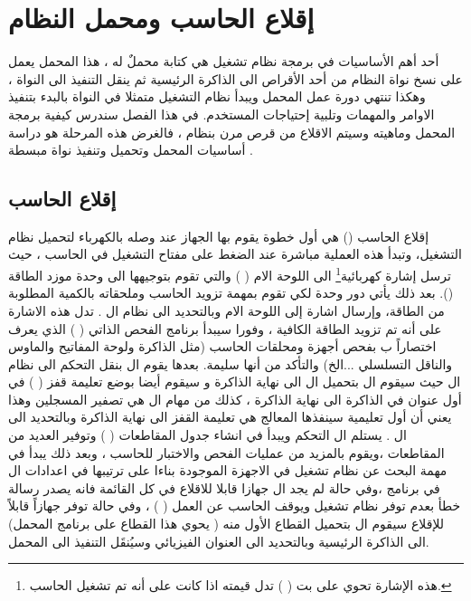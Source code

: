 \documentclass[document.tex]{subfiles}
\begin{document}
\chapter{إقلاع الحاسب ومحمل النظام }
أحد أهم الأساسيات في برمجة نظام تشغيل هي كتابة محملٌ له ، هذا المحمل يعمل على نسخ نواة النظام من أحد الأقراص الى الذاكرة الرئيسية ثم ينقل التنفيذ الى النواة ، وهكذا تنتهي دورة عمل المحمل ويبدأ نظام التشغيل متمثلا في النواة بالبدء بتنفيذ الاوامر والمهمات وتلبية إحتياجات المستخدم. في هذا الفصل سندرس كيفية برمجة المحمل وماهيته وسيتم الاقلاع من قرص مرن بنظام  ، فالغرض هذه المرحلة هو دراسة أساسيات المحمل وتحميل وتنفيذ نواة مبسطة .

\section{إقلاع الحاسب}

إقلاع الحاسب () هي أول خطوة يقوم بها الجهاز عند وصله بالكهرباء لتحميل نظام التشغيل، وتبدأ هذه العملية مباشرة عند الضغط على مفتاح التشغيل في الحاسب ، حيث ترسل إشارة كهربائية\footnote{هذه الإشارة تحوي على بت (  ) تدل قيمته اذا كانت  على أنه تم تشغيل الحاسب.} الى اللوحة الام (  ) والتي تقوم بتوجيهها الى وحدة موزد الطاقة (). بعد ذلك يأتي دور وحدة  لكي تقوم بمهمة تزويد الحاسب وملحقاته بالكمية المطلوبة من الطاقة، وإرسال اشارة  إلى اللوحة الام وبالتحديد الى نظام ال  .
تدل هذه الاشارة على أنه تم تزويد الطاقة الكافية ، وفورا سيبدأ برنامج الفحص الذاتي (  ) الذي يعرف اختصاراً ب  بفحص أجهزة ومحلقات الحاسب (مثل الذاكرة ولوحة المفاتيح والماوس والناقل التسلسلي ...الخ) والتأكد من أنها سليمة.
بعدها يقوم ال  بنقل التحكم الى نظام ال  حيث سيقوم ال  بتحميل ال  الى نهاية الذاكرة  و سيقوم أيضا بوضع تعليمة قفز (  ) في أول عنوان في الذاكرة الى نهاية الذاكرة ، كذلك من مهام ال  هي تصفير المسجلين  وهذا يعني أن أول تعليمية سينفذها المعالج هي تعليمة القفز الى نهاية الذاكرة وبالتحديد الى ال  .
يستلم ال  التحكم ويبدأ في انشاء جدول المقاطعات (  ) وتوفير العديد من المقاطعات ،ويقوم بالمزيد من عمليات الفحص والاختبار للحاسب ، وبعد ذلك يبدأ في مهمة البحث عن نظام تشغيل في الاجهزة الموجودة بناءا على ترتيبها في اعدادات ال  في برنامج  ،وفي حالة لم يجد ال  جهازا قابلا للاقلاع في كل القائمة فانه يصدر رسالة خطأ بعدم توفر نظام تشغيل ويوقف الحاسب عن العمل (  ) ، وفي حالة توفر جهازاً قابلاً للإقلاع سيقوم ال  بتحميل القطاع الأول منه ( يحوي هذا القطاع على برنامج المحمل) الى الذاكرة الرئيسية وبالتحديد الى العنوان الفيزيائي  وسيُنقَل التنفيذ الى المحمل.\\
\end{document}
